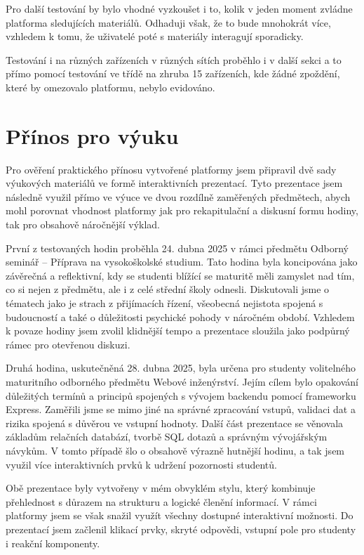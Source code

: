 Pro další testování by bylo vhodné vyzkoušet i to, kolik v jeden moment zvládne platforma sledujících materiálů.
Odhaduji však, že to bude mnohokrát více, vzhledem k tomu, že uživatelé poté s materiály interagují sporadicky.

Testování i na různých zařízeních v různých sítích proběhlo i v další sekci a to přímo pomocí testování ve třídě na zhruba 15 zařízeních, kde žádné zpoždění, které by omezovalo platformu, nebylo evidováno.

\section{Přínos pro výuku}

Pro ověření praktického přínosu vytvořené platformy jsem připravil dvě sady výukových materiálů ve formě interaktivních prezentací. 
Tyto prezentace jsem následně využil přímo ve výuce ve dvou rozdílně zaměřených předmětech, abych mohl porovnat vhodnost platformy jak pro rekapitulační a diskusní formu hodiny, tak pro obsahově náročnější výklad.

První z testovaných hodin proběhla 24. dubna 2025 v rámci předmětu Odborný seminář -- Příprava na vysokoškolské studium. 
Tato hodina byla koncipována jako závěrečná a reflektivní, kdy se studenti blížící se maturitě měli zamyslet nad tím, co si nejen z předmětu, ale i z celé střední školy odnesli. 
Diskutovali jsme o tématech jako je strach z přijímacích řízení, všeobecná nejistota spojená s budoucností a také o důležitosti psychické pohody v náročném období. 
Vzhledem k povaze hodiny jsem zvolil klidnější tempo a prezentace sloužila jako podpůrný rámec pro otevřenou diskuzi.

Druhá hodina, uskutečněná 28. dubna 2025, byla určena pro studenty volitelného maturitního odborného předmětu Webové inženýrství. 
Jejím cílem bylo opakování důležitých termínů a principů spojených s vývojem backendu pomocí frameworku Express. 
Zaměřili jsme se mimo jiné na správné zpracování vstupů, validaci dat a rizika spojená s důvěrou ve vstupní hodnoty. 
Další část prezentace se věnovala základům relačních databází, tvorbě SQL dotazů a správným vývojářským návykům. 
V tomto případě šlo o obsahově výrazně hutnější hodinu, a tak jsem využil více interaktivních prvků k udržení pozornosti studentů.

Obě prezentace byly vytvořeny v mém obvyklém stylu, který kombinuje přehlednost s důrazem na strukturu a logické členění informací.
V rámci platformy jsem se však snažil využít všechny dostupné interaktivní možnosti.
Do prezentací jsem začlenil klikací prvky, skryté odpovědi, vstupní pole pro studenty i reakční komponenty.

